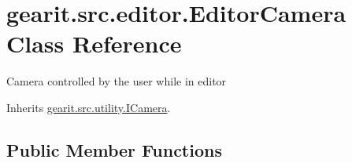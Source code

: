 \hypertarget{classgearit_1_1src_1_1editor_1_1_editor_camera}{\section{gearit.\+src.\+editor.\+Editor\+Camera Class Reference}
\label{classgearit_1_1src_1_1editor_1_1_editor_camera}
}


Camera controlled by the user while in editor  




Inherits \hyperlink{interfacegearit_1_1src_1_1utility_1_1_i_camera}{gearit.\+src.\+utility.\+I\+Camera}.

\subsection*{Public Member Functions}
